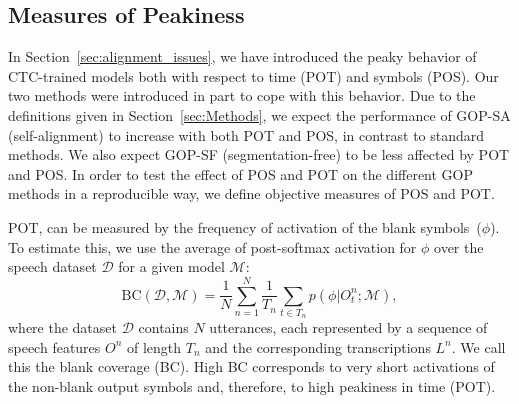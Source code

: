 \subsection{Measures of Peakiness}
In Section~\ref{sec:alignment_issues}, we have introduced the peaky behavior of CTC-trained models both with respect to time (POT) and symbols (POS).
Our two methods were introduced in part to cope with this behavior.
Due to the definitions given in Section~\ref{sec:Methods}, we expect the performance of GOP-SA (self-alignment) to increase with both POT and POS, in contrast to standard methods.
We also expect GOP-SF (segmentation-free) to be less affected by POT and POS.
In order to test the effect of POS and POT on the different GOP methods in a reproducible way, 
%
we define objective measures of POS and POT.
 
POT, can be measured by the frequency of activation of the blank symbols~($\phi$).
To estimate this, we use the average of post-softmax activation for $\phi$ over the speech dataset $\mathcal{D}$ for a given model $\mathcal{M}$:
\begin{equation}
    \text{BC}(\mathcal{D},\mathcal{M}) = \frac{1}{N}\sum_{n=1}^N\frac{1}{T_n}\sum_{t \in T_n}p(\phi|O_t^n;\mathcal{M}),
\end{equation}
where the dataset $\mathcal{D}$ contains $N$ utterances, each represented by a sequence of speech features $O^n$ of length $T_n$ and the corresponding transcriptions $L^n$.
We call this the blank coverage (BC).
High BC corresponds to very short activations of the non-blank output symbols and, therefore, to high peakiness in time (POT).

